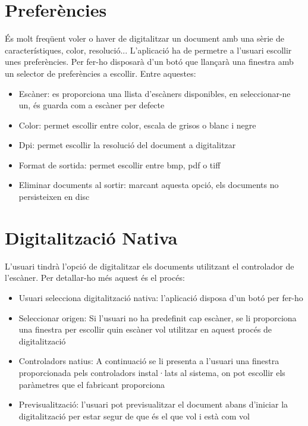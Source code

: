 \documentclass[letterpaper,11pt,catalan]{sphinxmanual}
\begin{document}
\section{Preferències}
\label{\detokenize{index:preferencies}}
És molt freqüent voler o haver de digitalitzar un document amb una sèrie de característiques,
color, resolució...
L'aplicació ha de permetre a l'usuari escollir unes preferències. Per fer-ho disposarà
d'un botó que llançarà una finestra amb un selector de preferències a escollir. Entre
aquestes:
\begin{itemize}
\item {} 
Escàner: es proporciona una llista d'escàners disponibles, en seleccionar-ne un, és guarda com a escàner per defecte

\item {} 
Color: permet escollir entre color, escala de grisos o blanc i negre

\item {} 
Dpi: permet escollir la resolució del document a digitalitzar

\item {} 
Format de sortida: permet escollir entre bmp, pdf o tiff

\item {} 
Eliminar documents al sortir: marcant aquesta opció, els documents no persisteixen en disc

\end{itemize}


\section{Digitalització Nativa}
\label{\detokenize{index:digitalitzacio-nativa}}
L'usuari tindrà l'opció de digitalitzar els documents utilitzant el controlador
de l'escàner. Per detallar-ho més aquest és el procés:
\begin{itemize}
\item {} 
Usuari selecciona digitalització nativa: l'aplicació disposa d'un botó per fer-ho

\item {} 
Seleccionar origen: Si l'usuari no ha predefinit cap escàner, se li proporciona
una finestra per escollir quin escàner vol utilitzar en aquest procés de digitalització

\item {} 
Controladors natius: A continuació se li presenta a l'usuari una finestra proporcionada
pels controladors instal·lats al sistema, on pot escollir els paràmetres que el fabricant
proporciona

\item {} 
Previsualització: l'usuari pot previsualitzar el document abans d'iniciar la digitalització
per estar segur de que és el que vol i està com vol

\end{itemize}
\end{document}
